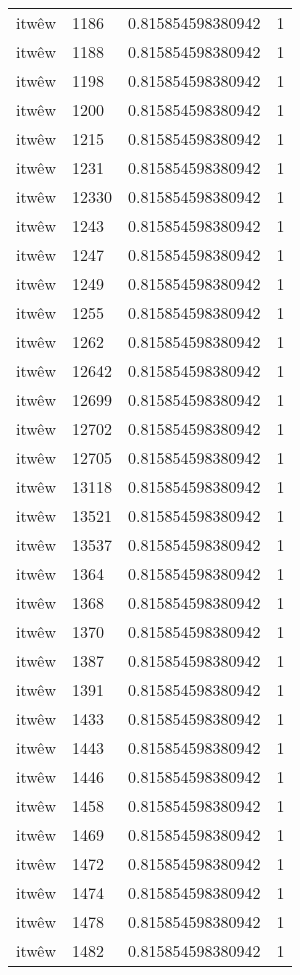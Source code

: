 \begin{longtable}{llll}
itwêw & 1186 & 0.815854598380942 & 1 \\
itwêw & 1188 & 0.815854598380942 & 1 \\
itwêw & 1198 & 0.815854598380942 & 1 \\
itwêw & 1200 & 0.815854598380942 & 1 \\
itwêw & 1215 & 0.815854598380942 & 1 \\
itwêw & 1231 & 0.815854598380942 & 1 \\
itwêw & 12330 & 0.815854598380942 & 1 \\
itwêw & 1243 & 0.815854598380942 & 1 \\
itwêw & 1247 & 0.815854598380942 & 1 \\
itwêw & 1249 & 0.815854598380942 & 1 \\
itwêw & 1255 & 0.815854598380942 & 1 \\
itwêw & 1262 & 0.815854598380942 & 1 \\
itwêw & 12642 & 0.815854598380942 & 1 \\
itwêw & 12699 & 0.815854598380942 & 1 \\
itwêw & 12702 & 0.815854598380942 & 1 \\
itwêw & 12705 & 0.815854598380942 & 1 \\
itwêw & 13118 & 0.815854598380942 & 1 \\
itwêw & 13521 & 0.815854598380942 & 1 \\
itwêw & 13537 & 0.815854598380942 & 1 \\
itwêw & 1364 & 0.815854598380942 & 1 \\
itwêw & 1368 & 0.815854598380942 & 1 \\
itwêw & 1370 & 0.815854598380942 & 1 \\
itwêw & 1387 & 0.815854598380942 & 1 \\
itwêw & 1391 & 0.815854598380942 & 1 \\
itwêw & 1433 & 0.815854598380942 & 1 \\
itwêw & 1443 & 0.815854598380942 & 1 \\
itwêw & 1446 & 0.815854598380942 & 1 \\
itwêw & 1458 & 0.815854598380942 & 1 \\
itwêw & 1469 & 0.815854598380942 & 1 \\
itwêw & 1472 & 0.815854598380942 & 1 \\
itwêw & 1474 & 0.815854598380942 & 1 \\
itwêw & 1478 & 0.815854598380942 & 1 \\
itwêw & 1482 & 0.815854598380942 & 1 \\

\end{longtable}
